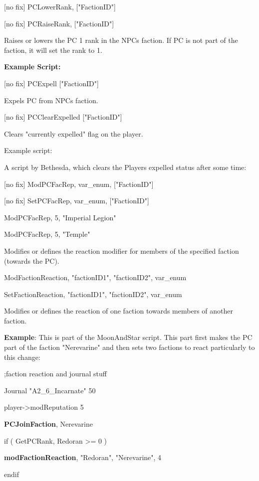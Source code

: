\documentclass[
]{article}
\begin{document}
{[}no fix{]} PCLowerRank, {[}"FactionID"{]}

{[}no fix{]} PCRaiseRank, {[}"FactionID"{]}

Raises or lowers the PC 1 rank in the NPCs faction. If PC is not part of
the faction, it will set the rank to 1.

\textbf{Example Script:}



{[}no fix{]} PCExpell {[}"FactionID"{]}

Expels PC from NPCs faction.

{[}no fix{]} PCClearExpelled {[}"FactionID"{]}

Clears "currently expelled" flag on the player.

Example script:

A script by Bethesda, which clears the Players expelled status after
some time:



{[}no fix{]} ModPCFacRep, var\_enum, {[}"FactionID"{]}

{[}no fix{]} SetPCFacRep, var\_enum, {[}"FactionID"{]}

ModPCFacRep, 5, "Imperial Legion"

ModPCFacRep, 5, "Temple"

Modifies or defines the reaction modifier for members of the specified
faction (towards the PC).

ModFactionReaction, "factionID1", "factionID2", var\_enum

SetFactionReaction, "factionID1", "factionID2", var\_enum

Modifies or defines the reaction of one faction towards members of
another faction.

\textbf{Example}: This is part of the MoonAndStar script. This part
first makes the PC part of the faction "Nerevarine" and then sets two
factions to react particularly to this change:

;faction reaction and journal stuff

Journal "A2\_6\_Incarnate" 50

player-\textgreater modReputation 5

\textbf{PCJoinFaction}, Nerevarine

if ( GetPCRank, Redoran \textgreater= 0 )

\textbf{modFactionReaction}, "Redoran", "Nerevarine", 4

endif
\end{document}
